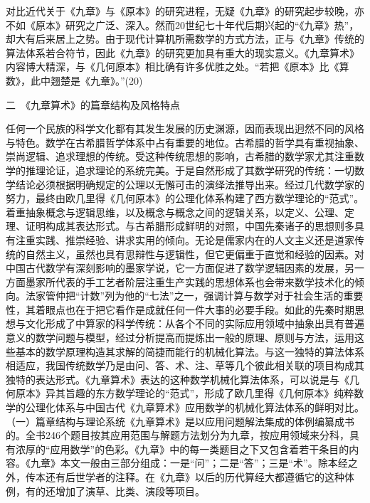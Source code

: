 \documentclass[a4paper,12pt,UTF8,twoside]{ctexbook}
\begin{document}
对比近代关于《九章》与《原本》的研究进程，无疑《九章》的研究起步较晚，亦不如《原本》研究之广泛、深入。然而20世纪七十年代后期兴起的“《九章》热”，却大有后来居上之势。由于现代计算机所需数学的方式方法，正与《九章》传统的算法体系若合符节，因此《九章》的研究更加具有重大的现实意义。《九章算术》内容博大精深，与《几何原本》相比确有许多优胜之处。“若把《原本》比《算数》，此中翘楚是《九章》。”(20)

二　《九章算术》的篇章结构及风格特点

任何一个民族的科学文化都有其发生发展的历史渊源，因而表现出迥然不同的风格与特色。数学在古希腊哲学体系中占有重要的地位。古希腊的哲学具有重视抽象、崇尚逻辑、追求理想的传统。受这种传统思想的影响，古希腊的数学家尤其注重数学的推理论证，追求理论的系统完美。于是自然形成了其数学研究的传统：一切数学结论必须根据明确规定的公理以无懈可击的演绎法推导出来。经过几代数学家的努力，最终由欧几里得《几何原本》的公理化体系构建了西方数学理论的“范式”。着重抽象概念与逻辑思维，以及概念与概念之间的逻辑关系，以定义、公理、定理、证明构成其表达形式。与古希腊形成鲜明的对照，中国先秦诸子的思想则多具有注重实践、推崇经验、讲求实用的倾向。无论是儒家内在的人文主义还是道家传统的自然主义，虽然也具有思辩性与逻辑性，但它更偏重于直觉和经验的因素。对中国古代数学有深刻影响的墨家学说，它一方面促进了数学逻辑因素的发展，另一方面墨家所代表的手工艺者阶层注重生产实践的思想体系也会带来数学技术化的倾向。法家管仲把“计数”列为他的“七法”之一，强调计算与数学对于社会生活的重要性，其着眼点也在于把它看作是成就任何一件大事的必要手段。如此的先秦时期思想与文化形成了中算家的科学传统：从各个不同的实际应用领域中抽象出具有普遍意义的数学问题与模型，经过分析提高而提炼出一般的原理、原则与方法，运用这些基本的数学原理构造其求解的简捷而能行的机械化算法。与这一独特的算法体系相适应，我国传统数学乃是由问、答、术、注、草等几个彼此相关联的项目构成其独特的表达形式。《九章算术》表达的这种数学机械化算法体系，可以说是与《几何原本》异其旨趣的东方数学理论的“范式”，形成了欧几里得《几何原本》纯粹数学的公理化体系与中国古代《九章算术》应用数学的机械化算法体系的鲜明对比。
（一）篇章结构与理论系统《九章算术》是以应用问题解法集成的体例编纂成书的。全书246个题目按其应用范围与解题方法划分为九章，按应用领域来分科，具有浓厚的“应用数学”的色彩。《九章》中的每一类题目之下又包含着若干条目的内容。《九章》本文一般由三部分组成：一是“问”；二是“答”；三是“术”。除本经之外，传本还有后世学者的注释。在《九章》以后的历代算经大都遵循它的这种体例，有的还增加了演草、比类、演段等项目。
\end{document}
